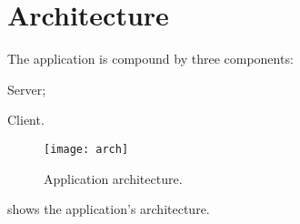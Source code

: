 \chapter{Architecture}\label{ch:arch}

The application is compound by three components:
\begin{enumerate*}[label=]
	\item Server;
	\item Client.
\end{enumerate*}

\begin{figure}[p]
	\texttt{[image: arch]}
	\caption{Application architecture.}\label{fig:arch}
\end{figure}

 shows the application's architecture.






